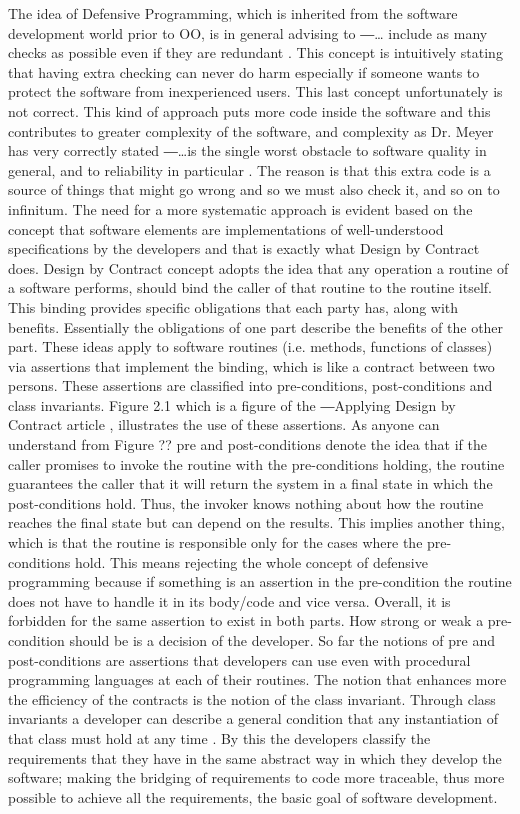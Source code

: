 {The idea of Defensive Programming, which is inherited from the software development world prior to OO, is in general advising to ―… include as many checks as possible even if they are redundant \cite{meyer1992applying}. This concept is intuitively stating that having extra checking can never do harm especially if someone wants to protect the software from inexperienced users. This last concept unfortunately is not correct. This kind of approach puts more code inside the software and this contributes to greater complexity of the software, and complexity as Dr. Meyer has very correctly stated ―…is the single worst obstacle to software quality in general, and to reliability in particular \cite{meyer1992applying}. The reason is that this extra code is a source of things that might go wrong and so we must also check it, and so on to infinitum. The need for a more systematic approach is evident based on the concept that software elements are implementations of well-understood specifications by the developers and that is exactly what Design by Contract does. Design by Contract concept adopts the idea that any operation a routine of a software performs, should bind the caller of that routine to the routine itself. This binding provides specific obligations that each party has, along with benefits. Essentially the obligations of one part describe the benefits of the other part. These ideas apply to software routines (i.e. methods, functions of classes) via assertions that implement the binding, which is like a contract between two persons. These assertions are classified into pre-conditions, post-conditions and class invariants. Figure 2.1 which is a figure of the ―Applying Design by Contract article \cite{meyer1992applying}, illustrates the use of these assertions.
As anyone can understand from Figure ?? pre and post-conditions denote the idea that if the caller promises to invoke the routine with the pre-conditions holding, the routine guarantees the caller that it will return the system in a final state in which the post-conditions hold. Thus, the invoker knows nothing about how the routine reaches the final state but can depend on the results. This implies another thing, which is that the routine is responsible only for the cases where the pre- conditions hold. This means rejecting the whole concept of defensive programming because if something is an assertion in the pre-condition the routine does not have to handle it in its body/code and vice versa. Overall, it is forbidden for the same assertion to exist in both parts. How strong or weak a pre-condition should be is a decision of the developer. So far the notions of pre and post-conditions are assertions that developers can use even with procedural programming languages at each of their routines. The notion that enhances more the efficiency of the contracts is the notion of the class invariant. Through class invariants a developer can describe a general condition that any instantiation of that class must hold at any time \cite{meyer1992applying, meyer1988object}. By this the developers classify the requirements that they have in the same abstract way in which they develop the software; making the bridging of requirements to code more traceable, thus more possible to achieve all the requirements, the basic goal of software development.
}
